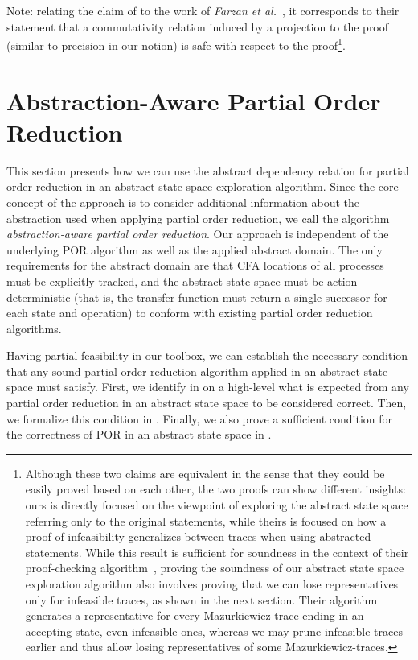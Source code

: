 \documentclass[numbook]{svjour3}
\begin{document}
Note: relating the claim of  to the work of \emph{Farzan et al.}~\cite{farzan_stratified_commutativity}, it corresponds to their statement that a commutativity relation induced by a projection to the proof (similar to precision in our notion) is safe with respect to the proof\footnote{Although these two claims are equivalent in the sense that they could be easily proved based on each other, the two proofs can show different insights: ours is directly focused on the viewpoint of exploring the abstract state space referring only to the original statements, while theirs is focused on how a proof of infeasibility generalizes between traces when using abstracted statements. While this result is sufficient for soundness in the context of their proof-checking algorithm~\cite{farzan_sound_sequentialization}, proving the soundness of our abstract state space exploration algorithm also involves proving that we can lose representatives only for infeasible traces, as shown in the next section. Their algorithm generates a representative for every Mazurkiewicz-trace ending in an accepting state, even infeasible ones, whereas we may prune infeasible traces earlier and thus allow losing representatives of some Mazurkiewicz-traces.}.


\section{Abstraction-Aware Partial Order Reduction}
\label{sec:aapor}

This section presents how we can use the abstract dependency relation for partial order reduction in an abstract state space exploration algorithm. Since the core concept of the approach is to consider additional information about the abstraction used when applying partial order reduction, we call the algorithm \emph{abstraction-aware partial order reduction}. Our approach is independent of the underlying POR algorithm as well as the applied abstract domain. The only requirements for the abstract domain are that CFA locations of all processes must be explicitly tracked, and the abstract state space must be action-deterministic (that is, the transfer function must return a single successor for each state and operation) to conform with existing partial order reduction algorithms.

Having partial feasibility in our toolbox, we can establish the necessary condition that any sound partial order reduction algorithm applied in an abstract state space must satisfy. First, we identify in  on a high-level what is expected from any partial order reduction in an abstract state space to be considered correct. Then, we formalize this condition in . Finally, we also prove a sufficient condition for the correctness of POR in an abstract state space in .
\end{document}

